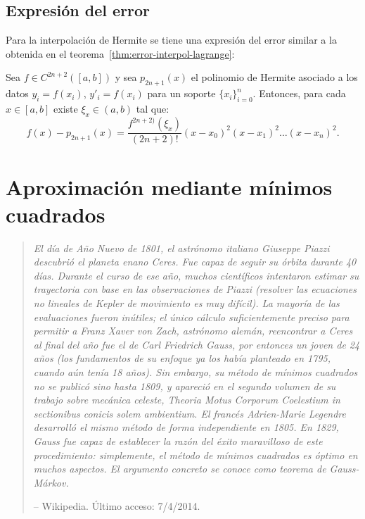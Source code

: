  \subsection*{Expresión del error}
 \label{sec:expresion-del-error-hermite}

 Para la interpolación de Hermite se tiene una expresión del error
 similar a la obtenida en el teorema~\ref{thm:error-interpol-lagrange}:
 \begin{theorem}
   Sea $f\in C^{2n+2}([a,b])$ y sea $p_{2n+1}(x)$ el polinomio de
   Hermite asociado a los datos $y_i=f(x_i)$, $y'_i=f(x_i)$ para un
   soporte $\{x_i\}_{i=0}^n$. Entonces, para cada $x\in [a,b]$ existe
   $\xi_x\in (a,b)$ tal que:
   \begin{equation*}
     f(x)-p_{2n+1}(x)=\frac{f^{2n+2)}(\xi_x)}{(2n+2)!} (x-x_0)^2(x-x_1)^2\dots(x-x_n)^2.
   \end{equation*}
 \end{theorem}

 \section{Aproximación mediante mínimos cuadrados}
 \label{sec:minimos-cuadrados}

 \begin{quotation}
   \it\tiny El día de Año Nuevo de 1801, el astrónomo italiano Giuseppe
   Piazzi descubrió el planeta enano Ceres. Fue capaz de seguir su
   órbita durante 40 días. Durante el curso de ese año, muchos
   científicos intentaron estimar su trayectoria con base en las
   observaciones de Piazzi (resolver las ecuaciones no lineales de
   Kepler de movimiento es muy difícil). La mayoría de las evaluaciones
   fueron inútiles; el único cálculo suficientemente preciso para
   permitir a Franz Xaver von Zach, astrónomo alemán, reencontrar a
   Ceres al final del año fue el de Carl Friedrich Gauss, por entonces
   un joven de 24 años (los fundamentos de su enfoque ya los había
   planteado en 1795, cuando aún tenía 18 años). Sin embargo, su método
   de mínimos cuadrados no se publicó sino hasta 1809, y apareció en el
   segundo volumen de su trabajo sobre mecánica celeste, Theoria Motus
   Corporum Coelestium in sectionibus conicis solem ambientium. El
   francés Adrien-Marie Legendre desarrolló el mismo método de forma
   independiente en 1805.  En 1829, Gauss fue capaz de establecer la
   razón del éxito maravilloso de este procedimiento: simplemente, el
   método de mínimos cuadrados es óptimo en muchos aspectos. El
   argumento concreto se conoce como teorema de Gauss-Márkov.
   \par\hfill
   -- Wikipedia. Último acceso: 7/4/2014.
 \end{quotation}

